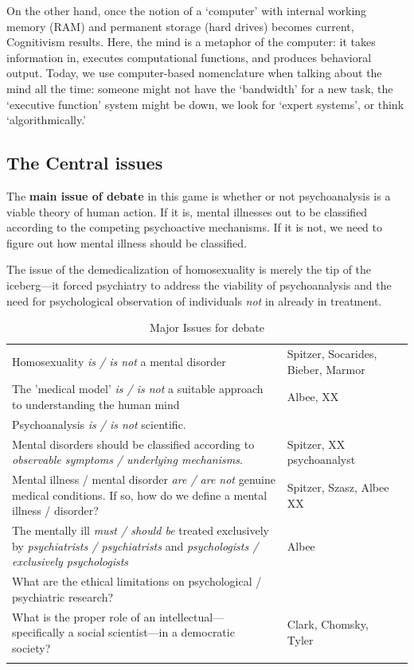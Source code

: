 \begin{refsection}
On the other hand, once the notion of a `computer' with internal working memory (RAM) and permanent storage (hard drives) becomes current, Cognitivism results. Here, the mind is a metaphor of the computer: it takes information in, executes computational functions, and produces behavioral output. Today, we use computer-based nomenclature when talking about the mind all the time: someone might not have the `bandwidth' for a new task, the `executive function' system might be down, we look for `expert systems', or think `algorithmically.' 

\subsection{The Central issues}
\label{thecentralissues}

The \textbf{main issue of debate} in this game is whether or not psychoanalysis is a viable theory of human action. If it is, mental illnesses out to be classified according to the competing psychoactive mechanisms. If it is not, we need to figure out how mental illness should be classified.

The issue of the demedicalization of homosexuality is merely the tip of the iceberg---it forced psychiatry to address the viability of psychoanalysis and the need for psychological observation of individuals \emph{not} in already in treatment.

 \begin{longtable}[!t]{ | P{7cm} | P{2cm} |  P{2cm} | }
\hline

&& \\ \hline \hline
Homosexuality \emph{is / is not} a mental disorder&Spitzer, Socarides, Bieber, Marmor& \\ \hline
The 'medical model' \emph{is / is not} a suitable approach to understanding the human mind&Albee, XX& \\ \hline
Psychoanalysis \emph{is / is not} scientific.&& \\ \hline
Mental disorders should be classified according to \emph{observable symptoms / underlying mechanisms}.&Spitzer, XX psychoanalyst& \\ \hline
Mental illness / mental disorder \emph{are / are not} genuine medical conditions. If so, how do we define a mental illness / disorder?&Spitzer, Szasz, Albee XX& \\ \hline
The mentally ill \emph{must / should be} treated exclusively by \emph{psychiatrists / psychiatrists} and \emph{psychologists / exclusively psychologists} &Albee& \\ \hline
What are the ethical limitations on psychological / psychiatric research?&& \\ \hline
What is the proper role of an intellectual---specifically a social scientist---in a democratic society?&Clark, Chomsky, Tyler& \\ \hline
\caption{Major Issues for debate}
\label{table: majorissues}
\end{longtable}


\end{refsection}
